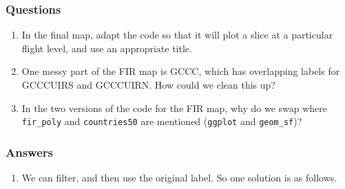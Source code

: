 \documentclass[
]{book}
\providecommand{\tightlist}{%
  \setlength{\itemsep}{0pt}\setlength{\parskip}{0pt}}
\begin{document}
\hypertarget{questions-10}{%
\subsubsection{Questions}\label{questions-10}}

\begin{enumerate}
\def\labelenumi{\arabic{enumi})}
\tightlist
\item
  In the final map, adapt the code so that it will plot a slice at a particular flight level, and use an appropriate title.
\item
  One messy part of the FIR map is GCCC, which has overlapping labels for GCCCUIRS and GCCCUIRN. How could we clean this up?
\item
  In the two versions of the code for the FIR map, why do we swap where \texttt{fir\_poly} and \texttt{countries50} are mentioned (\texttt{ggplot} and \texttt{geom\_sf})?
\end{enumerate}

\hypertarget{answers-10}{%
\subsubsection{Answers}\label{answers-10}}

\begin{enumerate}
\def\labelenumi{\arabic{enumi})}
\tightlist
\item
  We can filter, and then use the original label. So one solution is as follows.
\end{enumerate}
\end{document}
